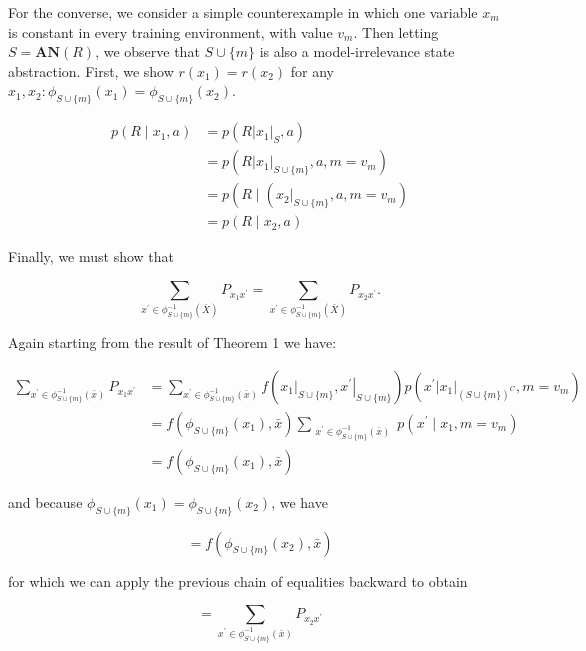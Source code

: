\documentclass[10pt]{article}
\begin{document}
For the converse, we consider a simple counterexample in which one variable $x_{m}$ is constant in every training environment, with value $v_{m}$. Then letting $S=\mathbf{A N}(R)$, we observe that $S \cup\{m\}$ is also a model-irrelevance state abstraction. First, we show $r\left(x_{1}\right)=r\left(x_{2}\right)$ for any $x_{1}, x_{2}: \phi_{S \cup\{m\}}\left(x_{1}\right)=\phi_{S \cup\{m\}}\left(x_{2}\right)$.

\[
\begin{aligned}
p\left(R \mid x_{1}, a\right) & =p\left(R\left|x_{1}\right|_{S}, a\right) \\
& =p\left(R\left|x_{1}\right|_{S \cup\{m\}}, a, m=v_{m}\right) \\
& =p\left(R \mid\left(\left.x_{2}\right|_{S \cup\{m\}}, a, m=v_{m}\right)\right. \\
& =p\left(R \mid x_{2}, a\right)
\end{aligned}
\]

Finally, we must show that

\[
\sum_{x^{\prime} \in \phi_{S \cup\{m\}}^{-1}(\bar{X})} P_{x_{1} x^{\prime}}=\sum_{x^{\prime} \in \phi_{S \cup\{m\}}^{-1}(\bar{X})} P_{x_{2} x^{\prime}} .
\]

Again starting from the result of Theorem 1 we have:

\[
\begin{aligned}
\sum_{x^{\prime} \in \phi_{S \cup\{m\}}^{-1}(\bar{x})} P_{x_{1} x^{\prime}} & =\sum_{x^{\prime} \in \phi_{S \cup\{m\}}^{-1}(\bar{x})} f\left(\left.x_{1}\right|_{S \cup\{m\}},\left.x^{\prime}\right|_{S \cup\{m\}}\right) p\left(x^{\prime}\left|x_{1}\right|_{(S \cup\{m\})^{C}}, m=v_{m}\right) \\
& =f\left(\phi_{S \cup\{m\}}\left(x_{1}\right), \bar{x}\right) \sum_{\substack{x^{\prime} \in \phi_{S \cup\{m\}}^{-1}(\bar{x})}} p\left(x^{\prime} \mid x_{1}, m=v_{m}\right) \\
& =f\left(\phi_{S \cup\{m\}}\left(x_{1}\right), \bar{x}\right)
\end{aligned}
\]

and because $\phi_{S \cup\{m\}}\left(x_{1}\right)=\phi_{S \cup\{m\}}\left(x_{2}\right)$, we have

\[
=f\left(\phi_{S \cup\{m\}}\left(x_{2}\right), \bar{x}\right)
\]

for which we can apply the previous chain of equalities backward to obtain

\[
=\sum_{x^{\prime} \in \phi_{S \cup\{m\}}^{-1}(\bar{x})} P_{x_{2} x^{\prime}}
\]
\end{document}
